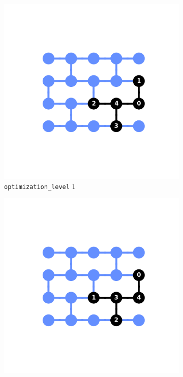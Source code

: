 \documentclass[11pt]{article}
\begin{document}
\begin{figure}[hbtp]
\begin{subfigure}{0.24\linewidth}
        \includegraphics[width=\linewidth]{outputs/routing_FakeAlmadenV2_1.png}
        \caption{\texttt{optimization\_level} $1$}
    \end{subfigure}
    \begin{subfigure}{0.24\linewidth}
        \centering
        \includegraphics[width=\linewidth]{outputs/routing_FakeAlmadenV2_2.png}

\end{subfigure}
\end{figure}
\end{document}
